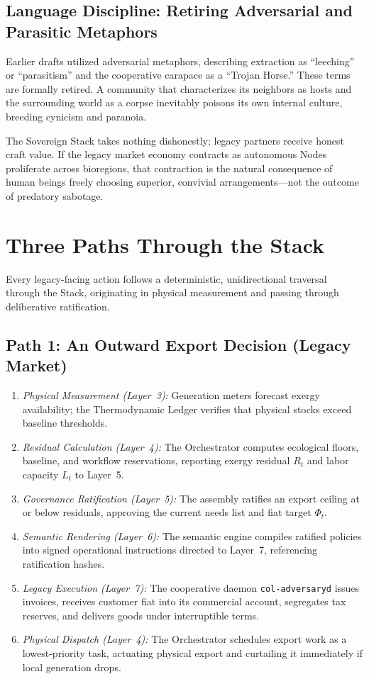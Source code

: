 \subsection{Language Discipline: Retiring Adversarial and Parasitic Metaphors}

Earlier drafts utilized adversarial metaphors, describing extraction as ``leeching'' or ``parasitism'' and the cooperative carapace as a ``Trojan Horse.'' These terms are formally retired. A community that characterizes its neighbors as hosts and the surrounding world as a corpse inevitably poisons its own internal culture, breeding cynicism and paranoia. 

The Sovereign Stack takes nothing dishonestly; legacy partners receive honest craft value. If the legacy market economy contracts as autonomous Nodes proliferate across bioregions, that contraction is the natural consequence of human beings freely choosing superior, convivial arrangements—not the outcome of predatory sabotage.

\section{Three Paths Through the Stack}

Every legacy-facing action follows a deterministic, unidirectional traversal through the Stack, originating in physical measurement and passing through deliberative ratification.

\subsection{Path 1: An Outward Export Decision (Legacy Market)}
\begin{enumerate}
  \item \textit{Physical Measurement (Layer~3):} Generation meters forecast exergy availability; the Thermodynamic Ledger verifies that physical stocks exceed baseline thresholds.
  \item \textit{Residual Calculation (Layer~4):} The Orchestrator computes ecological floors, baseline, and workflow reservations, reporting exergy residual $R_t$ and labor capacity $L_t$ to Layer~5.
  \item \textit{Governance Ratification (Layer~5):} The assembly ratifies an export ceiling at or below residuals, approving the current needs list and fiat target $\Phi_t$.
  \item \textit{Semantic Rendering (Layer~6):} The semantic engine compiles ratified policies into signed operational instructions directed to Layer~7, referencing ratification hashes.
  \item \textit{Legacy Execution (Layer~7):} The cooperative daemon \texttt{col-adversaryd} issues invoices, receives customer fiat into its commercial account, segregates tax reserves, and delivers goods under interruptible terms.
  \item \textit{Physical Dispatch (Layer~4):} The Orchestrator schedules export work as a lowest-priority task, actuating physical export and curtailing it immediately if local generation drops.
\end{enumerate}

